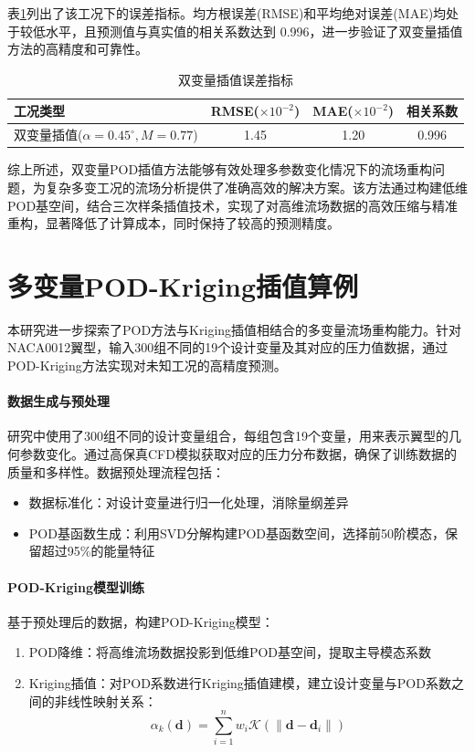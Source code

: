 表\ref{tab:double_error}列出了该工况下的误差指标。均方根误差(RMSE)和平均绝对误差(MAE)均处于较低水平，且预测值与真实值的相关系数达到 0.996，进一步验证了双变量插值方法的高精度和可靠性。

\begin{table}[H]
\centering
\caption{双变量插值误差指标}
\label{tab:double_error}
\begin{tabular}{lccc}
\toprule
工况类型 & RMSE($\times10^{-2}$) & MAE($\times10^{-2}$) & 相关系数 \\
\midrule
双变量插值($\alpha=0.45^\circ, M=0.77$) & 1.45 & 1.20 & 0.996 \\
\bottomrule
\end{tabular}
\end{table}

综上所述，双变量POD插值方法能够有效处理多参数变化情况下的流场重构问题，为复杂多变工况的流场分析提供了准确高效的解决方案。该方法通过构建低维POD基空间，结合三次样条插值技术，实现了对高维流场数据的高效压缩与精准重构，显著降低了计算成本，同时保持了较高的预测精度。
\section{多变量POD-Kriging插值算例}
\label{sec:multi_variable_pod_kriging}

本研究进一步探索了POD方法与Kriging插值相结合的多变量流场重构能力。针对NACA0012翼型，输入300组不同的19个设计变量及其对应的压力值数据，通过POD-Kriging方法实现对未知工况的高精度预测。

\paragraph{数据生成与预处理}
研究中使用了300组不同的设计变量组合，每组包含19个变量，用来表示翼型的几何参数变化。通过高保真CFD模拟获取对应的压力分布数据，确保了训练数据的质量和多样性。数据预处理流程包括：
\begin{itemize}
    \item {数据标准化}：对设计变量进行归一化处理，消除量纲差异
    \item {POD基函数生成}：利用SVD分解构建POD基函数空间，选择前50阶模态，保留超过95\%的能量特征
\end{itemize}

\paragraph{POD-Kriging模型训练}
基于预处理后的数据，构建POD-Kriging模型：
\begin{enumerate}
    \item {POD降维}：将高维流场数据投影到低维POD基空间，提取主导模态系数
    \item {Kriging插值}：对POD系数进行Kriging插值建模，建立设计变量与POD系数之间的非线性映射关系：
    \begin{equation}
        \alpha_k(\boldsymbol{d}) = \sum_{i=1}^n w_i \mathcal{K}(\|\boldsymbol{d} - \boldsymbol{d}_i\|)
        \label{eq:kriging_model}
    \end{equation}
\end{enumerate}

